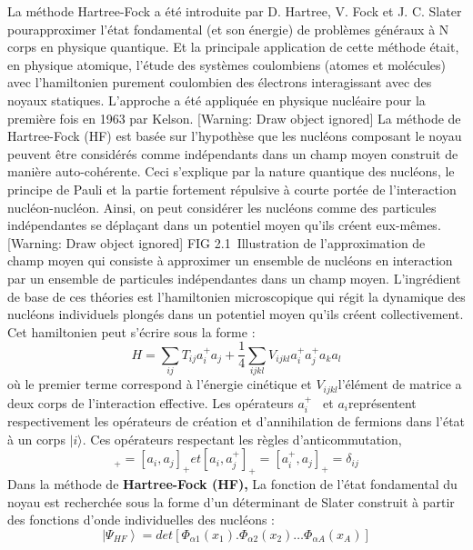  La méthode Hartree-Fock a été introduite par D. Hartree, V. Fock et J. C. Slater pourapproximer l'état
fondamental (et son énergie) de problèmes généraux à N corps en physique quantique. Et la principale application de
cette méthode était, en physique atomique, l'étude des systèmes coulombiens (atomes et molécules) avec l'hamiltonien
purement coulombien des électrons interagissant avec des noyaux statiques. L'approche a été appliquée en physique
nucléaire pour la première fois en 1963 par Kelson.
[Warning: Draw object ignored] La méthode de Hartree-Fock (HF) est basée sur l'hypothèse que les nucléons
composant le noyau peuvent être considérés comme indépendants dans un champ moyen construit de manière auto-cohérente.
Ceci s'explique par la nature quantique des nucléons, le principe de Pauli et la partie fortement répulsive à courte
portée de l'interaction nucléon-nucléon. Ainsi, on peut considérer les nucléons comme des particules indépendantes se
déplaçant dans un potentiel moyen qu'ils créent eux-mêmes.
[Warning: Draw object ignored]
FIG 2.1~Illustration de l'approximation de champ moyen qui consiste à approximer un ensemble de nucléons en interaction
par un ensemble de particules indépendantes dans un champ moyen.
L'ingrédient de base de ces théories est l'hamiltonien microscopique qui régit la dynamique des nucléons individuels
plongés dans un potentiel moyen qu'ils créent collectivement. Cet hamiltonien peut s'écrire sous la forme :
 \begin{equation}H=\sum _{\mathit{ij}}T_{\mathit{ij}}a_i^+a_j+\frac{ 1}{ 4}\sum_{\mathit{ijkl}}V_{\mathit{ijkl}}a_i^+a_j^+a_ka_l
\end{equation}
où le premier terme correspond à l'énergie cinétique et $V_{\mathit{ijkl}}$l'élément de matrice a deux corps de
l'interaction effective. Les opérateurs $a_i^+$ \textit{\ }et $a_i$représentent respectivement les opérateurs
de création et d'annihilation de fermions dans l'état à un corps $|i \rangle$. Ces opérateurs respectant les
règles d'anticommutation,
 \begin{equation}[a_i^+,a_j^+]_+=[a_i,a_j]_+ \mathit{et}[a_i,a_j^+]_+ =[a_i^+,a_j]_+ = \delta_{ij}
\end{equation}
Dans la méthode de \textbf{Hartree-Fock (HF),} La fonction de l'état fondamental du noyau est recherchée sous la forme
d'un déterminant de Slater construit à partir des fonctions d'onde individuelles des nucléons :
\begin{equation}| \left.\Psi _{\mathit{HF}}\right\rangle
=\mathit{det}\left[\Phi _{\mathit{\alpha 1}}\left(x_1\right).\Phi _{\mathit{\alpha 2}}\left(x_2\right){\dots}\Phi
_{\mathit{\alpha A}}\left(x_A\right)\right]\end{equation}
